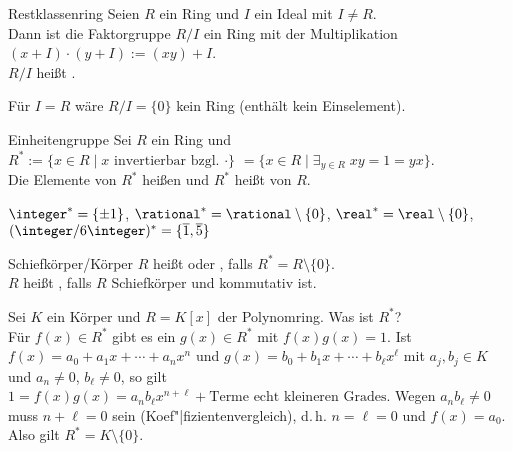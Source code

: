 \begin{Prop}{Restklassenring}
    Seien $R$ ein Ring und $I$ ein Ideal mit $I \not= R$.\\
    Dann ist die Faktorgruppe $R/I$ ein Ring mit der Multiplikation
    $(x + I) \cdot (y + I) := (xy) + I$.\\
    $R/I$ heißt .
\end{Prop}

\begin{Bem}
    Für $I = R$ wäre $R/I = \{0\}$ kein Ring (enthält kein Einselement).
\end{Bem}

\linie

\begin{Def}{Einheitengruppe}
    Sei $R$ ein Ring und\\
    $R^\ast := \{x \in R \;|\; x \text{ invertierbar bzgl. } \cdot\}$
    $= \{x \in R \;|\; \exists_{y \in R}\; xy = 1 = yx\}$.\\
    Die Elemente von $R^\ast$ heißen  und
    $R^\ast$ heißt  von $R$.
\end{Def}

\begin{Bsp}
    $\integer^\ast = \{\pm 1\}$,
    $\rational^\ast = \rational \setminus \{0\}$,
    $\real^\ast = \real \setminus \{0\}$,
    $(\integer/6\integer)^\ast = \{\overline{1}, \overline{5}\}$
\end{Bsp}

\begin{Def}{Schiefkörper/Körper}
    $R$ heißt  oder , falls
    $R^\ast = R \setminus \{0\}$.\\
    $R$ heißt , falls $R$ Schiefkörper und kommutativ ist.
\end{Def}

\begin{Bsp}
    Sei $K$ ein Körper und $R = K[x]$ der Polynomring.
    Was ist $R^\ast$?\\
    Für $f(x) \in R^\ast$ gibt es ein $g(x) \in R^\ast$ mit $f(x)g(x) = 1$.
    Ist $f(x) = a_0 + a_1 x + \dotsb + a_n x^n$ und
    $g(x) = b_0 + b_1 x + \dotsb + b_\ell x^\ell$ mit $a_j, b_j \in K$ und
    $a_n \not= 0$, $b_\ell \not= 0$, so gilt\\
    $1 = f(x) g(x) = a_n b_\ell x^{n+\ell} +
    \text{Terme echt kleineren Grades}$.
    Wegen $a_n b_\ell \not= 0$ muss $n + \ell = 0$ sein
    (Koef"|fizientenvergleich), d.\,h. $n = \ell = 0$ und
    $f(x) = a_0$.
    Also gilt $R^\ast = K \setminus \{0\}$.
\end{Bsp}

